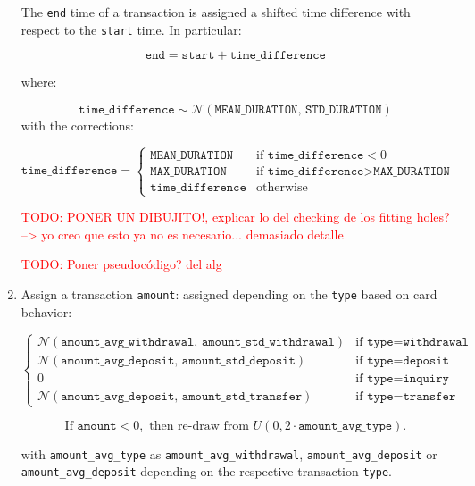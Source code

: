 \documentclass{article}
\begin{document}
\begin{enumerate}
    The \texttt{end} time of a transaction is assigned a shifted time difference with respect to the \texttt{start} time. In particular:

    $$
    \texttt{end} = \texttt{start} + \texttt{time\_difference}
    $$

    where:

    $$\texttt{time\_difference} \sim \mathcal{N}(\texttt{MEAN\_DURATION},\,\texttt{STD\_DURATION})$$ with the corrections:

    $$
    \texttt{time\_difference} =
    \begin{cases} 
        \texttt{MEAN\_DURATION} & \text{if } \texttt{time\_difference} < 0 \\
        \texttt{MAX\_DURATION} & \text{if } \texttt{time\_difference} > \texttt{MAX\_DURATION} \\
        \texttt{time\_difference} & \text{otherwise}
    \end{cases}
    $$

\textcolor{red}{TODO: PONER UN DIBUJITO!, explicar lo del checking de los fitting holes? --> yo creo que esto ya no es necesario... demasiado detalle}

\textcolor{red}{TODO: Poner pseudocódigo? del alg}

    \item Assign a transaction \texttt{amount}: assigned depending on the \texttt{type} based on card behavior:
    
$$
\begin{cases}
    \mathcal{N}(\texttt{amount\_avg\_withdrawal},\, \texttt{amount\_std\_withdrawal}) & \text{if } \texttt{type} = \texttt{withdrawal} \\[10pt]
    
    \mathcal{N}(\texttt{amount\_avg\_deposit},\, \texttt{amount\_std\_deposit}) & \text{if } \texttt{type} = \texttt{deposit} \\[10pt]

    0 & \text{if } \texttt{type} = \texttt{inquiry} \\[10pt]
    
    \mathcal{N}(\texttt{amount\_avg\_deposit},\, \texttt{amount\_std\_transfer}) & \text{if } \texttt{type} = \texttt{transfer}
\end{cases}
$$

$$
\text{If } \texttt{amount} < 0, \text{ then re-draw from } U(0, 2 \cdot \texttt{amount\_avg\_type}).
$$

with \texttt{amount\_avg\_type} as \texttt{amount\_avg\_withdrawal}, \texttt{amount\_avg\_deposit} or \texttt{amount\_avg\_deposit} depending on the respective transaction \texttt{type}.

\end{enumerate}
\end{document}

